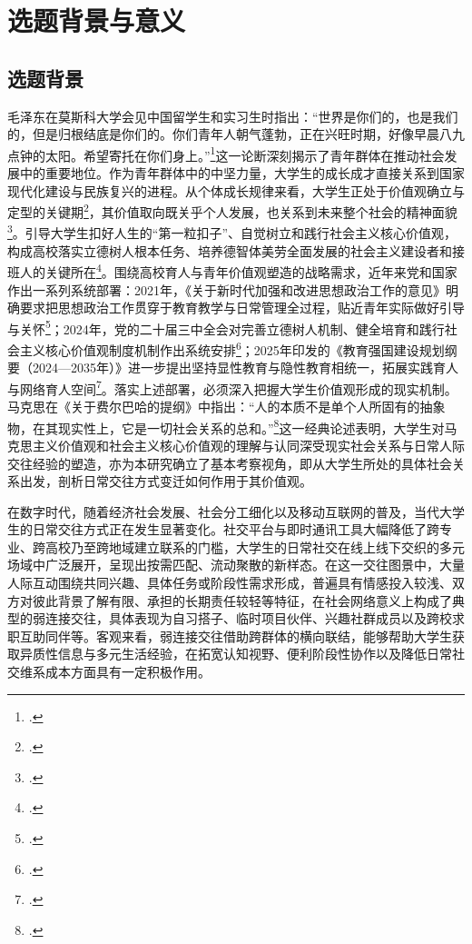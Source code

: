 \section{选题背景与意义}

\subsection{选题背景}

毛泽东在莫斯科大学会见中国留学生和实习生时指出：“世界是你们的，也是我们的，但是归根结底是你们的。你们青年人朝气蓬勃，正在兴旺时期，好像早晨八九点钟的太阳。希望寄托在你们身上。”\footcite{Mao1992Youth}这一论断深刻揭示了青年群体在推动社会发展中的重要地位。作为青年群体中的中坚力量，大学生的成长成才直接关系到国家现代化建设与民族复兴的进程。从个体成长规律来看，大学生正处于价值观确立与定型的关键期\footcite{CPCC2017_Plan}，其价值取向既关乎个人发展，也关系到未来整个社会的精神面貌\footcite{Xi2014}。引导大学生扣好人生的“第一粒扣子”、自觉树立和践行社会主义核心价值观，构成高校落实立德树人根本任务、培养德智体美劳全面发展的社会主义建设者和接班人的关键所在\footcite{CPCC2017_Ipe,Xi2018_Speech}。围绕高校育人与青年价值观塑造的战略需求，近年来党和国家作出一系列系统部署：2021年，《关于新时代加强和改进思想政治工作的意见》明确要求把思想政治工作贯穿于教育教学与日常管理全过程，贴近青年实际做好引导与关怀\footcite{CPCC2021_Yijian}；2024年，党的二十届三中全会对完善立德树人机制、健全培育和践行社会主义核心价值观制度机制作出系统安排\footcite{CPCC2024_Jueding}；2025年印发的《教育强国建设规划纲要（2024—2035年）》进一步提出坚持显性教育与隐性教育相统一，拓展实践育人与网络育人空间\footcite{CPCC2025_Gangyao}。落实上述部署，必须深入把握大学生价值观形成的现实机制。马克思在《关于费尔巴哈的提纲》中指出：“人的本质不是单个人所固有的抽象物，在其现实性上，它是一切社会关系的总和。”\footcite{MarxEngels2009}这一经典论述表明，大学生对马克思主义价值观和社会主义核心价值观的理解与认同深受现实社会关系与日常人际交往经验的塑造，亦为本研究确立了基本考察视角，即从大学生所处的具体社会关系出发，剖析日常交往方式变迁如何作用于其价值观。


在数字时代，随着经济社会发展、社会分工细化以及移动互联网的普及，当代大学生的日常交往方式正在发生显著变化。社交平台与即时通讯工具大幅降低了跨专业、跨高校乃至跨地域建立联系的门槛，大学生的日常社交在线上线下交织的多元场域中广泛展开，呈现出按需匹配、流动聚散的新样态。在这一交往图景中，大量人际互动围绕共同兴趣、具体任务或阶段性需求形成，普遍具有情感投入较浅、双方对彼此背景了解有限、承担的长期责任较轻等特征，在社会网络意义上构成了典型的弱连接交往，具体表现为自习搭子、临时项目伙伴、兴趣社群成员以及跨校求职互助同伴等。客观来看，弱连接交往借助跨群体的横向联结，能够帮助大学生获取异质性信息与多元生活经验，在拓宽认知视野、便利阶段性协作以及降低日常社交维系成本方面具有一定积极作用。


